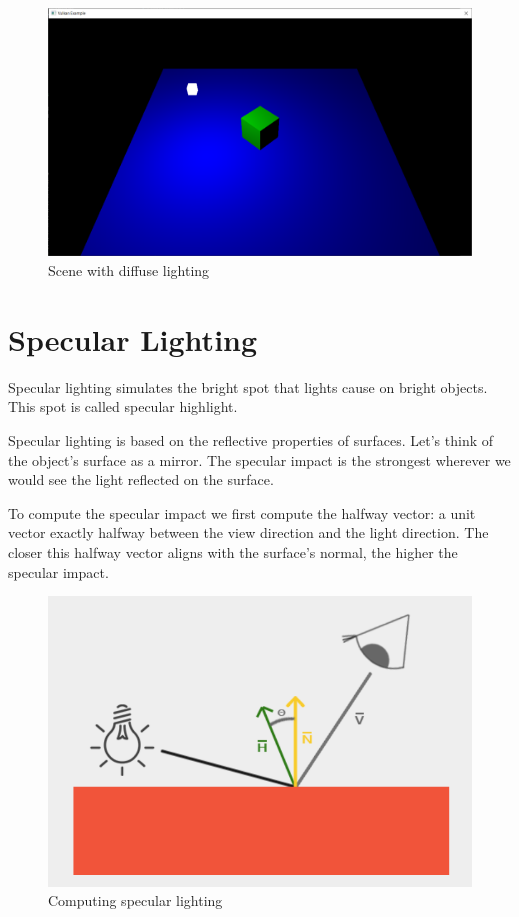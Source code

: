 \begin{figure}[ht]
    \centering
    \includegraphics[scale=0.25]{images/ChBlinnPhong/SceneDiffuse.png}
    \caption{Scene with diffuse lighting}
    \label{fig::SceneDiffuse}
\end{figure}

\section{Specular Lighting}

Specular lighting simulates the bright spot that lights cause on bright objects.
This spot is called specular highlight.

Specular lighting is based on the reflective properties of surfaces.
Let's think of the object's surface as a mirror.
The specular impact is the strongest wherever we would see the light
reflected on the surface.

To compute the specular impact we first compute the halfway vector:
a unit vector exactly halfway between the view direction and the light direction.
The closer this halfway vector aligns with the surface's normal, the higher
the specular impact.

\begin{figure}[ht]
    \centering
    \includegraphics[scale=0.40]{images/ChBlinnPhong/SpecularLighting.png}
    \caption{Computing specular lighting}
    \label{fig::SpecularLighting}
\end{figure}

